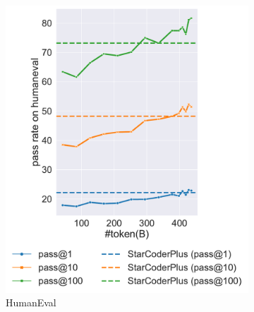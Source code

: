 \begin{figure}[t]
    \centering
    \begin{subfigure}{0.3\textwidth}
        \centering
        \includegraphics[width=\textwidth]{fig/humaneval-aurora-m.pdf}
        \vspace{0.42em}
        \caption{HumanEval}
        \label{fig:trend-he}
    \end{subfigure}
    \hfill
    \begin{subfigure}{0.3\textwidth}
        \centering

\end{subfigure}
\end{figure}

